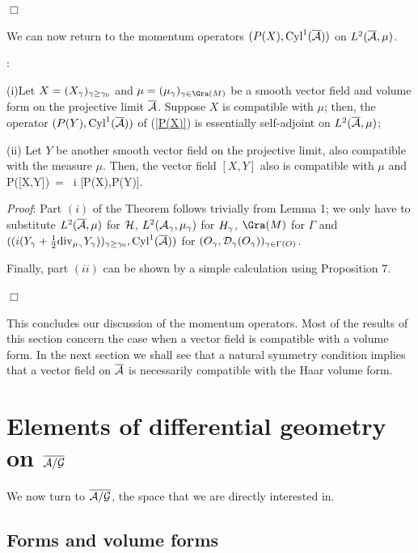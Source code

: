 $\Box$

\bigskip

We can now return to the momentum operators $(P(X), {\rm Cyl}^1({\overline {{\cal A}}}))$
on $L^2({\overline {{\cal A}}}, \mu)$. 

\begin{theorem}{\rm :} 

\noindent
(i)Let $X =(X_\gamma)_{\gamma\ge\gamma_0}$ and $\mu=(\mu_\g)_{\g\in\Gra(\S)}$ be a
smooth vector field and volume form on the projective limit ${\overline {{\cal A}}}$.
Suppose $X$ is compatible with $\mu$; then,  the operator
$(P(Y), {\rm Cyl}^1({\overline {{\cal A}}}))$ of (\ref{P(X)}) is essentially self-adjoint on
$L^2({\overline {{\cal A}}},\mu)$;

\noindent 
(ii) Let $Y$ be another smooth vector field on the projective 
limit, also compatible with the measure $\mu$. Then, the vector field 
$[X,Y]$ also is compatible with $\mu$ and 
\be
P([X,Y])\ = \ i [P(X),P(Y)].
\ee  
\end{theorem}

{\it Proof}{\rm:}
Part $(i)$ of the Theorem follows trivially from Lemma 1; we only have
to substitute $L^2({\overline {{\cal A}}},\mu)$ for ${\cal H}$, $L^2({\cal A}_\gamma, \mu_\gamma)$ for
$H_\gamma$, $\Gra(\S)$ for $\Gamma$ and $((i(Y_\gamma+{1\over
2}{\rm div}_{\mu_\gamma}Y_\gamma))_{\gamma \ge\gamma_0}, \\
{\rm Cyl}^1({\overline {{\cal A}}}))$ for $(O_\gamma, {\cal D}_{\gamma}(O_\gamma) )_{\gamma\in\Gamma(O)}$. 

Finally, part $(ii)$ can be shown by a simple calculation using
Proposition 7.  

$\Box$

\bigskip

This concludes our discussion of the momentum operators.  Most of the
results of this section concern the case when a vector field is
compatible with a volume form. In the next section we shall see that a
natural symmetry condition implies that a vector field on ${\overline {{\cal A}}}$ is
necessarily compatible with the Haar volume form.

\section{Elements of differential geometry on $\overline{{\cal A}/{\cal G}}$}

We now turn to $\overline{{\cal A}/{\cal G}}$, the space that we are directly interested in.

\subsection{Forms and volume forms}


